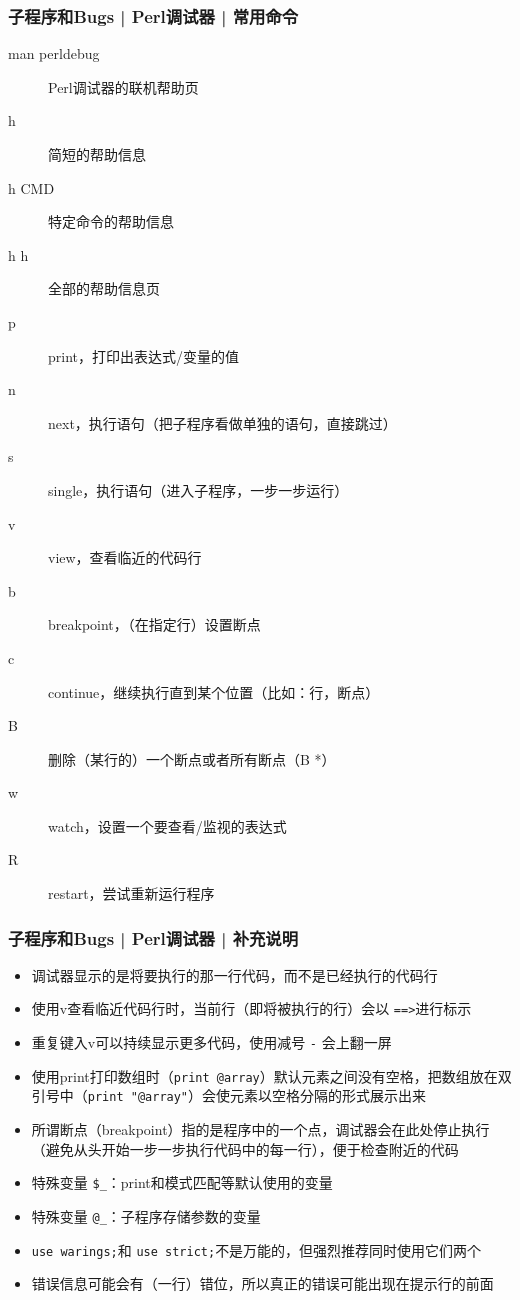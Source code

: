 \begin{frame}
  \frametitle{子程序和Bugs | Perl调试器 | \alert{常用命令}}
  \begin{description}
    \item[man perldebug] Perl调试器的联机帮助页
    \item[h] 简短的帮助信息
    \item[h CMD] 特定命令的帮助信息
    \item[h h] 全部的帮助信息页
    \item[p] print，打印出表达式/变量的值
    \item[n] next，执行语句（把子程序看做单独的语句，直接跳过）
    \item[s] single，执行语句（进入子程序，一步一步运行）
    \item[v] view，查看临近的代码行
    \item[b] breakpoint，（在指定行）设置断点
    \item[c] continue，继续执行直到某个位置（比如：行，断点）
    \item[B] 删除（某行的）一个断点或者所有断点（B *）
    \item[w] watch，设置一个要查看/监视的表达式
    \item[R] restart，尝试重新运行程序
  \end{description}
\end{frame}

\begin{frame}[fragile]
  \frametitle{子程序和Bugs | Perl调试器 | \alert{补充说明}}
  \begin{itemize}
    \item 调试器显示的是将要执行的那一行代码，而不是已经执行的代码行
    \item 使用v查看临近代码行时，当前行（即将被执行的行）会以 \verb|==>|进行标示
    \item 重复键入v可以持续显示更多代码，使用减号 \verb|-| 会上翻一屏
    \item 使用print打印数组时（\verb|print @array|）默认元素之间没有空格，把数组放在双引号中（\verb|print "@array"|）会使元素以空格分隔的形式展示出来
    \item 所谓断点（breakpoint）指的是程序中的一个点，调试器会在此处停止执行（避免从头开始一步一步执行代码中的每一行），便于检查附近的代码
    \item 特殊变量 \verb|$_|：print和模式匹配等默认使用的变量
    \item 特殊变量 \verb|@_|：子程序存储参数的变量
    \item \verb|use warings;|和 \verb|use strict;|不是万能的，但强烈推荐同时使用它们两个
    \item 错误信息可能会有（一行）错位，所以真正的错误可能出现在提示行的前面
  \end{itemize}
\end{frame}

